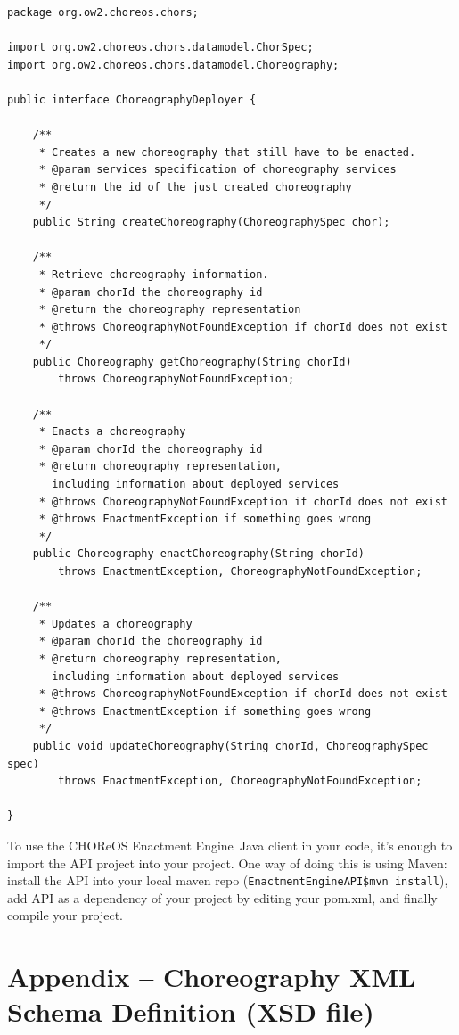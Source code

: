 \documentclass[a4paper, 10pt]{article}
\newcommand{\ee}{CHOReOS Enactment Engine}
\begin{document}
{\small
\lstset{language=Java}
\begin{lstlisting}[caption=\ee\ Java interface, label=lst:java_interface]
package org.ow2.choreos.chors;

import org.ow2.choreos.chors.datamodel.ChorSpec;
import org.ow2.choreos.chors.datamodel.Choreography;

public interface ChoreographyDeployer {
	
	/**
	 * Creates a new choreography that still have to be enacted.
	 * @param services specification of choreography services
	 * @return the id of the just created choreography
	 */
	public String createChoreography(ChoreographySpec chor);
	
	/**
	 * Retrieve choreography information.
	 * @param chorId the choreography id
	 * @return the choreography representation
	 * @throws ChoreographyNotFoundException if chorId does not exist 
	 */
	public Choreography getChoreography(String chorId) 
		throws ChoreographyNotFoundException;

	/**
	 * Enacts a choreography
	 * @param chorId the choreography id
	 * @return choreography representation, 
	   including information about deployed services 
	 * @throws ChoreographyNotFoundException if chorId does not exist 
	 * @throws EnactmentException if something goes wrong 
	 */
	public Choreography enactChoreography(String chorId) 
		throws EnactmentException, ChoreographyNotFoundException;

	/**
	 * Updates a choreography
	 * @param chorId the choreography id
	 * @return choreography representation, 
	   including information about deployed services 
	 * @throws ChoreographyNotFoundException if chorId does not exist 
	 * @throws EnactmentException if something goes wrong
	 */
	public void updateChoreography(String chorId, ChoreographySpec spec) 
		throws EnactmentException, ChoreographyNotFoundException;
	
}
\end{lstlisting}
}

To use the \ee\ Java client in your code, it's enough to import the API project into your project. One way of doing this is using Maven: install the API into your local maven repo (\texttt{EnactmentEngineAPI\$mvn install}), add API as a dependency of your project by editing your pom.xml, and finally compile your project.

\section*{Appendix -- Choreography XML Schema Definition (XSD file)}
\end{document}
